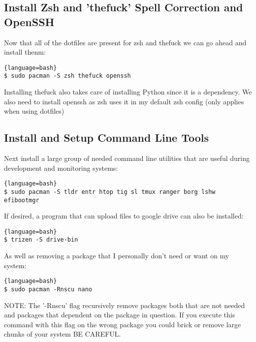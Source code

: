 \subsection{Install Zsh and 'thefuck' Spell Correction and OpenSSH}
Now that all of the dotfiles are present for zsh and thefuck we can go ahead and install thenm:
\begin{lstlisting}{language=bash}
$ sudo pacman -S zsh thefuck openssh
\end{lstlisting}
Installing thefuck also takes care of installing Python since it is a dependency.
We also need to install openssh as zsh uses it in my default zsh config (only applies when using dotfiles)


\subsection{Install and Setup Command Line Tools}
Next install a large group of needed command line utilities that are useful during development and monitoring systems:
\begin{lstlisting}{language=bash}
$ sudo pacman -S tldr entr htop tig sl tmux ranger borg lshw efibootmgr
\end{lstlisting}
If desired, a program that can upload files to google drive can also be installed:
\begin{lstlisting}{language=bash}
$ trizen -S drive-bin
\end{lstlisting}
As well as removing a package that I personally don't need or want on my system:
\begin{lstlisting}{language=bash}
$ sudo pacman -Rnscu nano
\end{lstlisting}
NOTE: The '-Rnscu' flag recursively remove packages both that are not needed and packages that dependent on the package in question. If you execute this command with this flag on the wrong package you could brick or remove large chunks of your system BE CAREFUL.



